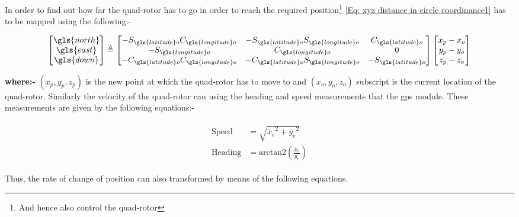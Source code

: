 In order to find out how far the quad-rotor has to go in order to reach the required position\footnote{And hence also control the quad-rotor} \eqref{Eq: xyz distance in circle coordinance1} has to be mapped using the following:-



\begin{equation}
	\begin{bmatrix}																
		\gls{north} \\
		\gls{east}  \\
		\gls{down}
	\end{bmatrix}
	\triangleq
	\begin{bmatrix}																
		-S_{\gls{latitude}o}C_{\gls{longitude}o} & -S_{\gls{latitude}o}S_{\gls{longitude}o} & C_{\gls{latitude}o}  \\
		-S_{\gls{longitude}o}                    & C_{\gls{longitude}o}                     & 0                    \\
		-C_{\gls{latitude}o}C_{\gls{longitude}o} & -C_{\gls{latitude}o}S_{\gls{longitude}o} & -S_{\gls{latitude}o}
	\end{bmatrix}
	\begin{bmatrix}																
		x_p - x_o \\
		y_p - y_o \\
		z_p - z_o 
	\end{bmatrix}
	\label{Eq: ecef frame mapping1}
\end{equation}

{\bf where:-} $(x_p, y_p, z_p)$ is the new point at which the quad-rotor has to move to and $(x_o, y_o, z_o)$ subscript is the current location of the quad-rotor. Similarly the velocity of the quad-rotor can using the heading and speed measurements that the \gls{gps} module. These measurements are given by the following equations:-

\begin{align}
	\begin{split}
		\mathrm{Speed} &= \sqrt{\dot{x_e}^2 +\dot{y_e}^2 }\\
		\mathrm{Heading} &= \textrm{arctan2}\left(\frac{\dot{x_e}}{\dot{y_e}}\right)
	\end{split}
\end{align}

Thus, the rate of change of position can also transformed by means of the following equations.

